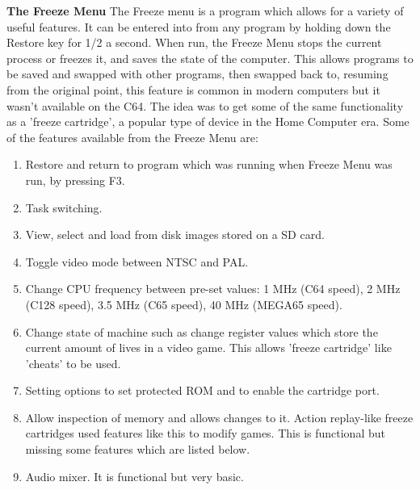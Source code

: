 \textbf{The Freeze Menu}
The Freeze menu is a program which allows for a variety of useful features. It can be entered into from any program by holding down the Restore key for 1/2 a second. When run, the Freeze Menu stops the current process or freezes it, and saves the state of the computer. This allows programs to be saved and swapped with other programs, then swapped back to, resuming from the original point, this feature is common in modern computers but it wasn't available on the C64. The idea was to get some of the same functionality as a 'freeze cartridge', a popular type of device in the Home Computer era. Some of the features available from the Freeze Menu are:
\begin{enumerate}
\item Restore and return to program which was running when Freeze Menu was run, by pressing F3.
\item Task switching.
\item View, select and load from disk images stored on a SD card.
\item Toggle video mode between NTSC and PAL.
\item Change CPU frequency between pre-set values: 1 MHz (C64 speed), 2 MHz (C128 speed), 3.5 MHz (C65 speed), 40 MHz (MEGA65 speed).
\item Change state of machine such as change register values which store the current amount of lives in a video game. This allows 'freeze cartridge' like 'cheats' to be used.
\item Setting options to set protected ROM and to enable the cartridge port.
\item Allow inspection of memory and allows changes to it. Action replay-like freeze cartridges used features like this to modify games. This is functional but missing some features which are listed below.
\item Audio mixer. It is functional but very basic.
\end{enumerate}

